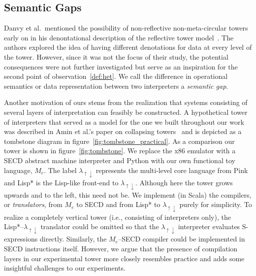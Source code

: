\documentclass[sigplan,anonymous,review]{acmart}
\newcommand{\mslang}{$\lambda_{\uparrow\downarrow}$}
\newcommand{\mevl}{$M_{e}$}
\theoremstyle{definition}
\newcommand{\note}[1]{{\color{red}[#1]}}
\newcommand{\todo}[1]{\note{TODO: #1}}
\begin{document}
\subsection{Semantic Gaps}
Danvy et al.~mentioned the possibility of non-reflective non-meta-circular towers early on in his denontational description of the reflective tower model~\cite{danvy1988intensions}. The authors explored the idea of having different denotations for data at every level of the tower. However, since it was not the focus of their study, the potential consequences were not further investigated but serve as an inspiration for the second point of observation~\ref{def:het}. We call the difference in operational semantics or data representation between two interpreters a \textit{semantic gap}.

Another motivation of ours stems from the realization that systems consisting of several layers of interpretation can feasibly be constructed. A hypothetical tower of interpreters that served as a model for the one we built throughout our work was described in Amin et al.'s paper on collapsing towers~\cite{amin2017collapsing} and is depicted as a tombstone diagram in figure~\ref{fig:tombstone_practical}. As a comparison our tower is shown in figure~\ref{fig:tombstone}. We replace the x86 emulator with a SECD abstract machine interpreter and Python with our own functional toy language, \mevl. The label \mslang{} represents the multi-level core language from Pink~\cite{amin2017collapsing} and Lisp* is the Lisp-like front-end to \mslang. Although here the tower grows upwards and to the left, this need not be. We implement (in Scala) the compilers, or \textit{translators}, from \mevl{} to SECD and from Lisp* to \mslang{} purely for simplicity. To realize a completely vertical tower (i.e., consisting of interpreters only), the Lisp*--\mslang{} translator could be omitted so that the \mslang{} interpreter evaluates S-expressions directly. Similarly, the \mevl--SECD compiler could be implemented in SECD instructions itself. However, we argue that the presence of compilation layers in our experimental tower more closely resembles practice and adds some insightful challenges to our experiments.

\end{document}
